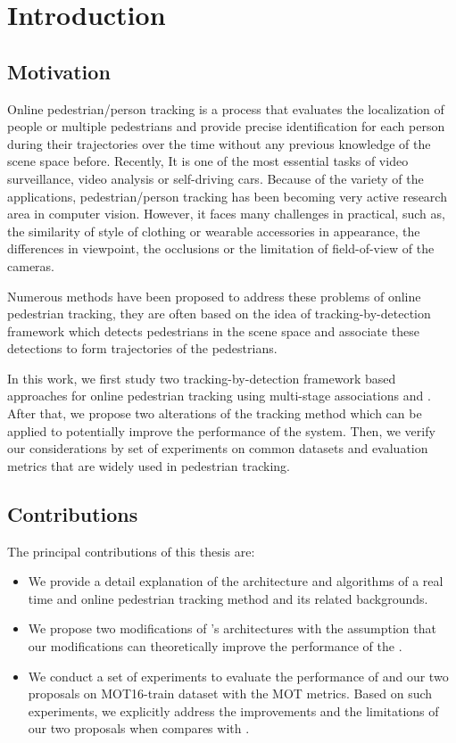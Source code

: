 \chapter{Introduction}
\section{Motivation}
\hspace{0.5cm}Online pedestrian/person tracking is a process that evaluates the localization of people or multiple pedestrians and provide precise identification for each person during their trajectories over the time without any previous knowledge of the scene space before. Recently, It is one of the most essential tasks of video surveillance, video analysis or self-driving cars. Because of the variety of the applications, pedestrian/person tracking has been becoming very active research area in computer vision. However, it faces many challenges in practical, such as, the similarity of style of clothing or wearable accessories in appearance, the differences in viewpoint, the occlusions or the limitation of field-of-view of the cameras.\par
Numerous methods have been proposed to address these problems of online pedestrian tracking, they are often based on the idea of tracking-by-detection framework which detects pedestrians in the scene space and associate these detections to form trajectories of the pedestrians.\par
In this work, we first study two tracking-by-detection framework based approaches for online pedestrian tracking using
multi-stage associations \cite{Wojke2017simple} and \cite{MultiTracking} . After that, we propose two alterations of the
tracking method \cite{Wojke2017simple} which can be applied to potentially improve the performance of the system. Then, we
verify our considerations by set of experiments on common datasets and evaluation metrics that are widely used in
pedestrian tracking.
\pagebreak
\section{Contributions}
\hspace{0.5cm} The principal contributions of this thesis are:
\begin{itemize}
    \item We provide a detail explanation of the architecture and algorithms of a real time and online pedestrian tracking method\cite{Wojke2017simple} and its related backgrounds.
    \item We propose two modifications of \cite{Wojke2017simple}'s architectures with the assumption that our modifications can theoretically improve the performance of the \cite{Wojke2017simple}.
    \item We conduct a set of experiments to evaluate the performance of \cite{Wojke2017simple} and our two proposals on MOT16-train dataset with the MOT metrics. Based on such experiments, we explicitly address the improvements and the limitations of our two proposals when compares with \cite{Wojke2017simple}.
\end{itemize}
